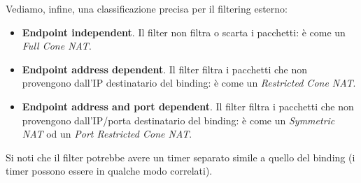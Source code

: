 Vediamo, infine, una classificazione precisa per il filtering esterno:
\begin{itemize}
	\item \textbf{Endpoint independent}. Il filter non filtra o scarta i pacchetti: è come un \textit{Full Cone NAT}.
	
	\item \textbf{Endpoint address dependent}. Il filter filtra i pacchetti che non provengono dall'IP destinatario del binding: è come un \textit{Restricted Cone NAT}.
	
	\item \textbf{Endpoint address and port dependent}. Il filter filtra i pacchetti che non provengono dall'IP/porta destinatario del binding: è come un \textit{Symmetric NAT} od un \textit{Port Restricted Cone NAT}.
\end{itemize}
Si noti che il filter potrebbe avere un timer separato simile a quello del binding (i timer possono essere in qualche modo correlati).

